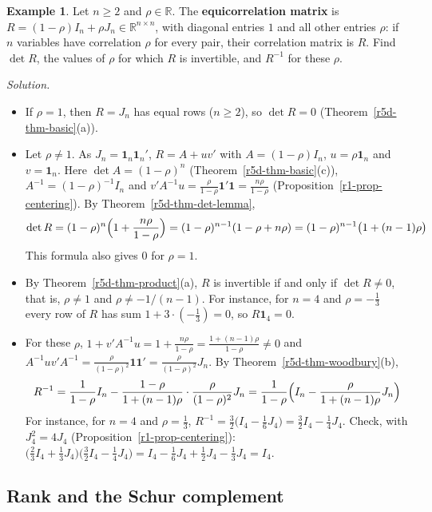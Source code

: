 \documentclass[12pt]{article}
\newcommand{\R}{\mathbb R}
\newcommand{\one}{\mathbf 1}
\theoremstyle{definition}
\newtheorem{example}[theorem]{Example}
\begin{document}
\begin{example}\label{r5d-exm-equicorrelation}
Let \(n\geqslant2\) and \(\rho\in\R\). The \textbf{equicorrelation matrix} is
\(R=(1-\rho)I_n+\rho J_n\in\R^{n\times n}\), with diagonal entries \(1\) and all other entries
\(\rho\): if \(n\) variables have correlation \(\rho\) for every pair, their correlation matrix is \(R\).
Find \(\det R\), the values of \(\rho\) for which \(R\) is invertible, and \(R^{-1}\) for these \(\rho\).

\textit{Solution.}
\begin{itemize}
\item If \(\rho=1\), then \(R=J_n\) has equal rows (\(n\geqslant2\)), so \(\det R=0\)
(Theorem~\ref{r5d-thm-basic}(a)).
\item Let \(\rho\ne1\). As \(J_n=\one_n\one_n'\), \(R=A+uv'\) with \(A=(1-\rho)I_n\), \(u=\rho\one_n\) and
\(v=\one_n\). Here \(\det A=(1-\rho)^n\) (Theorem~\ref{r5d-thm-basic}(c)),
\(A^{-1}=(1-\rho)^{-1}I_n\) and \(v'A^{-1}u=\frac{\rho}{1-\rho}\one'\one=\frac{n\rho}{1-\rho}\)
(Proposition~\ref{r1-prop-centering}). By Theorem~\ref{r5d-thm-det-lemma},
\[
\det R=(1-\rho)^n\Bigl(1+\frac{n\rho}{1-\rho}\Bigr)=(1-\rho)^{n-1}(1-\rho+n\rho)
=(1-\rho)^{n-1}\bigl(1+(n-1)\rho\bigr)
\]
This formula also gives \(0\) for \(\rho=1\).
\item By Theorem~\ref{r5d-thm-product}(a), \(R\) is invertible if and only if \(\det R\ne0\), that is,
\(\rho\ne1\) and \(\rho\ne-1/(n-1)\). For instance, for \(n=4\) and \(\rho=-\frac13\) every row of
\(R\) has sum \(1+3\cdot(-\frac13)=0\), so \(R\one_4=0\).
\item For these \(\rho\), \(1+v'A^{-1}u=1+\frac{n\rho}{1-\rho}=\frac{1+(n-1)\rho}{1-\rho}\ne0\) and
\(A^{-1}uv'A^{-1}=\frac{\rho}{(1-\rho)^2}\one\one'=\frac{\rho}{(1-\rho)^2}J_n\). By Theorem~\ref{r5d-thm-woodbury}(b),
\[
R^{-1}=\frac1{1-\rho}I_n-\frac{1-\rho}{1+(n-1)\rho}\cdot\frac{\rho}{(1-\rho)^2}J_n
=\frac1{1-\rho}\Bigl(I_n-\frac{\rho}{1+(n-1)\rho}J_n\Bigr)
\]
For instance, for \(n=4\) and \(\rho=\frac13\), \(R^{-1}=\frac32\bigl(I_4-\frac16J_4\bigr)=\frac32I_4-\frac14J_4\). Check,
with \(J_4^2=4J_4\) (Proposition~\ref{r1-prop-centering}): \(\bigl(\frac23I_4+\frac13J_4\bigr)\bigl(\frac32I_4-\frac14J_4\bigr)
=I_4-\frac16J_4+\frac12J_4-\frac13J_4=I_4\).
\end{itemize}
\end{example}

\subsection*{Rank and the Schur complement}
\end{document}

